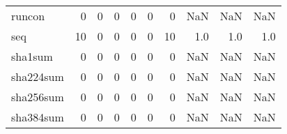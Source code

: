 \begin{longtable}{lrrrrrrrrr}
runcon    &                                       0 &                                                  0 &                                                  0 &                                                  0 &                                                  0 &                                                  0 &                                                NaN &                                    NaN &                                  NaN \\
seq       &                                      10 &                                                  0 &                                                  0 &                                                  0 &                                                  0 &                                                 10 &                                                1.0 &                                    1.0 &                                  1.0 \\
sha1sum   &                                       0 &                                                  0 &                                                  0 &                                                  0 &                                                  0 &                                                  0 &                                                NaN &                                    NaN &                                  NaN \\
sha224sum &                                       0 &                                                  0 &                                                  0 &                                                  0 &                                                  0 &                                                  0 &                                                NaN &                                    NaN &                                  NaN \\
sha256sum &                                       0 &                                                  0 &                                                  0 &                                                  0 &                                                  0 &                                                  0 &                                                NaN &                                    NaN &                                  NaN \\
sha384sum &                                       0 &                                                  0 &                                                  0 &                                                  0 &                                                  0 &                                                  0 &                                                NaN &                                    NaN &                                  NaN \\

\end{longtable}
